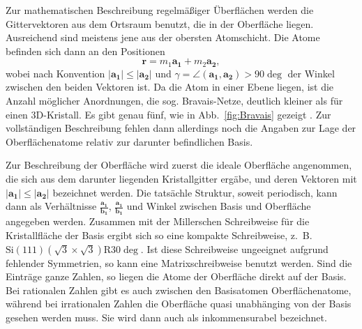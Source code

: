 Zur mathematischen Beschreibung regelmäßiger Überflächen werden die Gittervektoren 
aus dem Ortsraum benutzt, die in der Oberfläche liegen. Ausreichend sind meistens 
jene aus der obersten Atomschicht. Die Atome befinden sich dann an den Positionen 
\begin{equation}
    \mathbf{r} = m_1 \mathbf{a_1} + m_2 \mathbf{a_2},
\end{equation}
wobei nach Konvention $|\mathbf{a_1}| \le |\mathbf{a_2}|$ und 
$\gamma = \angle (\mathbf{a_1}, \mathbf{a_2}) > 90 \deg$ der Winkel zwischen den 
beiden Vektoren ist. Da die Atom in einer Ebene liegen, ist die Anzahl möglicher 
Anordnungen, die sog. Bravais-Netze, deutlich kleiner als für einen 3D-Kristall. 
Es gibt genau fünf, wie in Abb.~\ref{fig:Bravais} gezeigt 
\cite{henzler1991oberflachenphysik}.
Zur vollständigen Beschreibung fehlen dann allerdings noch die Angaben zur Lage 
der Oberflächenatome relativ zur darunter befindlichen Basis. 

Zur Beschreibung der Oberfläche wird zuerst die ideale Oberfläche angenommen, 
die sich aus dem darunter liegenden Kristallgitter ergäbe, und deren Vektoren mit
$|\mathbf{a_1}| \le |\mathbf{a_2}|$ bezeichnet werden. Die tatsächle Struktur, 
soweit periodisch, kann dann als Verhältnisse $\frac{\mathbf{a_1}}{\mathbf{b_1}}$, 
$\frac{\mathbf{a_1}}{\mathbf{b_1}}$ und Winkel zwischen Basis und Oberfläche angegeben 
werden. Zusammen mit der Millerschen Schreibweise für die Kristallfläche der Basis 
ergibt sich so eine kompakte Schreibweise, z.~B. 
$\mathrm{Si}(111)(\sqrt{3} \times \sqrt{3}) \mathrm{R} 30 \deg$. 
Ist diese Schreibweise ungeeignet aufgrund fehlender Symmetrien, so kann eine 
Matrixschreibweise benutzt werden. Sind die Einträge ganze Zahlen, so liegen die 
Atome der Oberfläche direkt auf der Basis. Bei rationalen Zahlen gibt es auch 
zwischen den Basisatomen Oberflächenatome, während bei irrationalen Zahlen die 
Oberfläche quasi unabhänging von der Basis gesehen werden muss. Sie wird dann auch 
als inkommensurabel bezeichnet. \cite{henzler1991oberflachenphysik}

